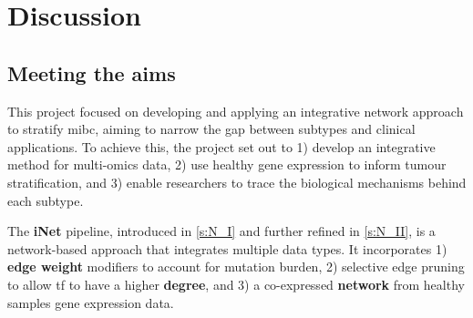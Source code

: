 \chapter{Discussion} \label{s:discussion}

\vspace{3mm}
\vspace{3mm}


\section{Meeting the aims}

This project focused on developing and applying an integrative network approach to stratify \acrlong{mibc}, aiming to narrow the gap between subtypes and clinical applications. To achieve this, the project set out to 1) develop an integrative method for multi-omics data, 2) use healthy gene expression to inform tumour stratification, and 3) enable researchers to trace the biological mechanisms behind each subtype.


The \textbf{iNet} pipeline, introduced in \cref{s:N_I} and further refined in \cref{s:N_II}, is a network-based approach that integrates multiple data types. It incorporates 1) \textbf{edge weight} modifiers to account for mutation burden, 2) selective edge pruning to allow \acrlong{tf} to have a higher \textbf{degree}, and 3) a co-expressed \textbf{network} from healthy samples gene expression data.


